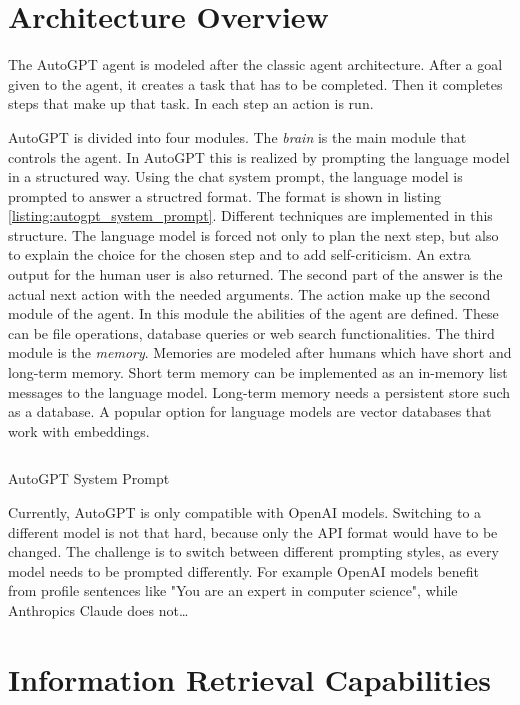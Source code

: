 \documentclass[english, version-2022-01]{uzl-thesis}
\begin{document}
\section{Architecture Overview}

The AutoGPT agent is modeled after the classic agent architecture. After a goal given to the agent, it creates a task that has to be completed. Then it completes steps that make up that task. In each step an action is run.

AutoGPT is divided into four modules. The \textit{brain} is the main module that controls the agent. In AutoGPT this is realized by prompting the language model in a structured way. Using the chat system prompt, the language model is prompted to answer a structred format. The format is shown in listing \ref{listing:autogpt_system_prompt}. Different techniques are implemented in this structure. The language model is forced not only to plan the next step, but also to explain the choice for the chosen step and to add self-criticism. An extra output for the human user is also returned. The second part of the answer is the actual next action with the needed arguments. The action make up the second module of the agent. In this module the abilities of the agent are defined. These can be file operations, database queries or web search functionalities. The third module is the \textit{memory}. Memories are modeled after humans which have short and long-term memory. Short term memory can be implemented as an in-memory list messages to the language model. Long-term memory needs a persistent store such as a database. A popular option for language models are vector databases that work with embeddings.

\begin{listing}
	\inputminted{jinja}{include/code/system-format.j2}
	\caption{AutoGPT System Prompt}
	\label{listing:autogpt_system_prompt}
\end{listing}

Currently, AutoGPT is only compatible with OpenAI models. Switching to a different model is not that hard, because only the API format would have to be changed. The challenge is to switch between different prompting styles, as every model needs to be prompted differently. For example OpenAI models benefit from profile sentences like "You are an expert in computer science", while Anthropics Claude does not\dots

\section{Information Retrieval Capabilities}
\end{document}

